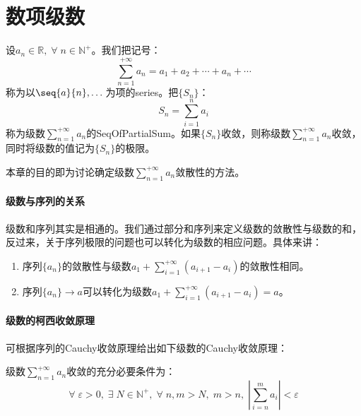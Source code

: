 \chapter{数项级数}

\begin{definition}
	设$a_n\in\mathbb{R},\;\forall\;n\in\mathbb{N}^+$。我们把记号：
	\begin{equation*}
		\sum_{n=1}^{+\infty}a_n=a_1+a_2+\cdots+a_n+\cdots
	\end{equation*}
	称为以$\seq{a}{n},\dots$为项的\gls{series}。把$\{S_n\}$：
	\begin{equation*}
		S_n=\sum_{i=1}^na_i
	\end{equation*}
	称为级数$\sum\limits_{n=1}^{+\infty}a_n$的\gls{SeqOfPartialSum}。如果$\{S_n\}$收敛，则称级数$\sum\limits_{n=1}^{+\infty}a_n$收敛，同时将级数的值记为$\{S_n\}$的极限。
\end{definition}
本章的目的即为讨论确定级数$\sum\limits_{n=1}^{+\infty}a_n$敛散性的方法。\par
\subsubsection{级数与序列的关系}
级数和序列其实是相通的。我们通过部分和序列来定义级数的敛散性与级数的和，反过来，关于序列极限的问题也可以转化为级数的相应问题。具体来讲：
\begin{enumerate}
	\item 序列$\{a_n\}$的敛散性与级数$a_1+\sum\limits_{i=1}^{+\infty}(a_{i+1}-a_i)$的敛散性相同。
	\item 序列$\{a_n\}\to a$可以转化为级数$a_1+\sum\limits_{i=1}^{+\infty}(a_{i+1}-a_i)=a$。
\end{enumerate}
\subsubsection{级数的柯西收敛原理}
可根据序列的Cauchy收敛原理给出如下级数的Cauchy收敛原理：
\begin{theorem}
	级数$\sum\limits_{n=1}^{+\infty}a_n$收敛的充分必要条件为：
	\begin{equation*}
		\forall\;\varepsilon>0,\;\exists\;N\in\mathbb{N}^+,\;\forall\;n,m>N,\;m>n,\;\left|\sum_{i=n}^ma_i\right|<\varepsilon
	\end{equation*}
\end{theorem}
